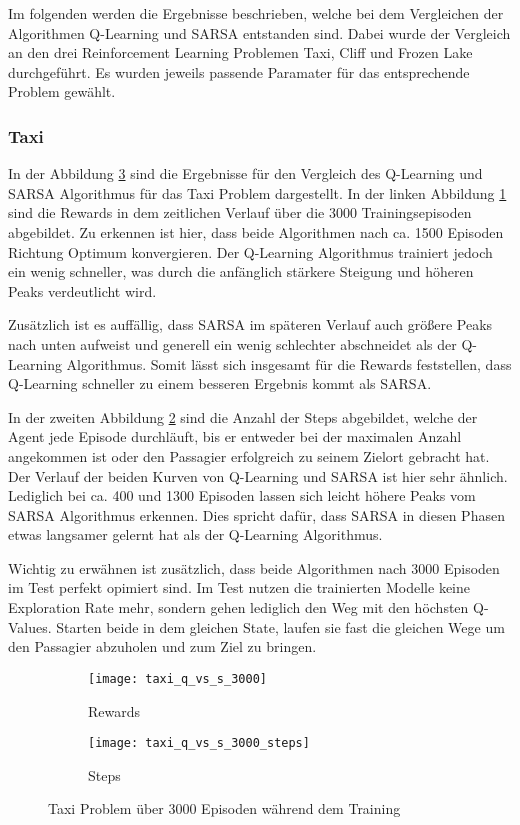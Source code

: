 Im folgenden werden die Ergebnisse beschrieben, welche bei dem Vergleichen der Algorithmen Q-Learning und SARSA entstanden sind.
Dabei wurde der Vergleich an den drei Reinforcement Learning Problemen Taxi, Cliff und Frozen Lake durchgeführt. Es wurden jeweils passende Paramater für das entsprechende Problem gewählt.
\subsubsection{Taxi}

In der Abbildung \ref{fig:taxi_train} sind die Ergebnisse für den Vergleich des Q-Learning und SARSA Algorithmus für das Taxi Problem dargestellt. In der linken Abbildung \ref{fig:taxi_rew} sind die Rewards in dem zeitlichen Verlauf über die 3000 Trainingsepisoden abgebildet. Zu erkennen ist hier, dass beide Algorithmen nach ca. 1500 Episoden Richtung Optimum konvergieren. Der Q-Learning Algorithmus trainiert jedoch ein wenig schneller, was durch die anfänglich stärkere Steigung und höheren Peaks verdeutlicht wird.

Zusätzlich ist es auffällig, dass SARSA im späteren Verlauf auch größere Peaks nach unten aufweist und generell ein wenig schlechter abschneidet als der Q-Learning Algorithmus. Somit lässt sich insgesamt für die Rewards feststellen, dass Q-Learning schneller zu einem besseren Ergebnis kommt als SARSA. 

In der zweiten Abbildung \ref{fig:taxi_step} sind die Anzahl der Steps abgebildet, welche der Agent jede Episode durchläuft, bis er entweder bei der maximalen Anzahl angekommen ist oder den Passagier erfolgreich zu seinem Zielort gebracht hat. Der Verlauf der beiden Kurven von Q-Learning und SARSA ist hier sehr ähnlich. Lediglich bei ca. 400 und 1300 Episoden lassen sich leicht höhere Peaks vom SARSA Algorithmus erkennen.
Dies spricht dafür, dass SARSA in diesen Phasen etwas langsamer gelernt hat als der Q-Learning Algorithmus.

Wichtig zu erwähnen ist zusätzlich, dass beide Algorithmen nach 3000 Episoden im Test perfekt opimiert sind. Im Test nutzen die trainierten Modelle keine Exploration Rate mehr, sondern gehen lediglich den Weg mit den höchsten Q-Values. Starten beide in dem gleichen State, laufen sie fast die gleichen Wege um den Passagier abzuholen und zum Ziel zu bringen.

\begin{figure}[H]
    \centering
    \begin{subfigure}{.5\textwidth}
      \centering
      \texttt{[image: taxi\_q\_vs\_s\_3000]}
      \caption{Rewards}
      \label{fig:taxi_rew}
    \end{subfigure}%
    \begin{subfigure}{.5\textwidth}
      \centering
      \texttt{[image: taxi\_q\_vs\_s\_3000\_steps]}
      \caption{Steps}
      \label{fig:taxi_step}
    \end{subfigure}
    \caption{Taxi Problem über 3000 Episoden während dem Training}
    \label{fig:taxi_train}
\end{figure}

